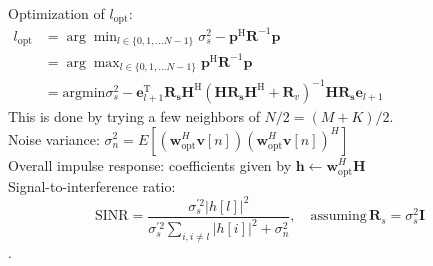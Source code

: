 \documentclass[english]{latex4ei/latex4ei_sheet}
\begin{document}
\begin{sectionbox}
  Optimization of $l_{\text{opt}}$:\\
  $\begin{aligned}l_{\mathrm{opt}}&=\arg \min _{l \in\{0,1, \ldots N-1\}} \sigma_{s}^{2}-\boldsymbol{p}^{\mathrm{H}} \boldsymbol{R}^{-1} \boldsymbol{p}\\&=\arg \max _{l \in\{0,1, \ldots N-1\}} \boldsymbol{p}^{\mathrm{H}} \boldsymbol{R}^{-1} \boldsymbol{p}\\&=\text{argmin} \sigma_{s}^{2}-\mathbf{e}_{l+1}^{\mathrm{T}} \boldsymbol{R}_{\boldsymbol{s}} \boldsymbol{H}^{\mathrm{H}}\left(\boldsymbol{H} \boldsymbol{R}_{\boldsymbol{s}} \boldsymbol{H}^{\mathrm{H}}+\boldsymbol{R}_{v}\right)^{-1} \boldsymbol{H} \boldsymbol{R}_{\boldsymbol{s}} \mathbf{e}_{l+1}\end{aligned}$\\
  This is done by trying a few neighbors of $N/2 = (M+K)/2$.\\

  Noise variance: $\sigma_n^2 = E[(\boldsymbol{w}_{\mathrm{opt}}^H\boldsymbol{v}[n])(\boldsymbol{w}_{\mathrm{opt}}^H\boldsymbol{v}[n])^H]$\\
  Overall impulse response: coefficients given by $\boldsymbol{h} \leftarrow \boldsymbol{w}_{\mathrm{opt}}^H\boldsymbol{H}$\\
  Signal-to-interference ratio: $$\text{SINR} = \frac{\sigma_s^{\prime 2}|h[l]|^2}{\sigma_s^{\prime 2}\sum_{i, i\neq l} |h[i]|^2 + \sigma_n^2}, \quad\text{assuming}\, \boldsymbol{R}_s = \sigma_s^2 \boldsymbol{I}$$.
\end{sectionbox}
\end{document}
